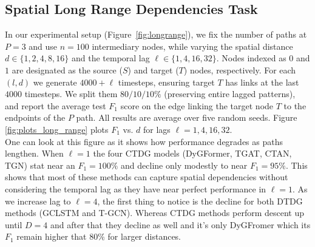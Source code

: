\subsection{Spatial Long Range Dependencies Task}
In our experimental setup (Figure~\ref{fig:longrange}), we fix the number of paths at $P=3$ and use $n=100$ intermediary nodes, while varying the spatial distance $d \in \{1, 2, 4, 8, 16\}$ and the temporal lag $\ell \in \{1, 4, 16, 32\}$. Nodes indexed as $0$ and $1$ are designated as the source ($S$) and target ($T$) nodes, respectively.
 For each $(l, d)$ we generate $4000 + \ell$ timesteps, ensuring target $T$ has links at the last $4000$ timesteps. We split them $80/10/10\%$ (preserving entire lagged patterns), and report the average test $F_1$  score on the edge linking the target node $T$ to the endpoints of the $P$ path. All results are average over five random seeds. Figure \ref{fig:plots_long_range} plots $F_1$ vs. $d$ for lags $\ell=1,4,16,32$. \\
One can look at this figure as it shows how performance degrades as paths lengthen. When $\ell=1$ the four CTDG models (DyGFormer, TGAT, CTAN, TGN) stat near an $F_1 = 100\%$ and decline only modestly to near $F_1 = 95\%$.
This shows that most of these methods can capture spatial dependencies without considering the temporal lag as they have near perfect performance in $\ell=1$.
As we increase lag to $\ell=4$, the first thing to notice is the decline for both DTDG methods (GCLSTM and T-GCN).
Whereas CTDG methods perform descent up until $D=4$ and after that they decline as well and it's only DyGFromer which its $F_1$ remain higher that $80\%$ for larger distances. \\
